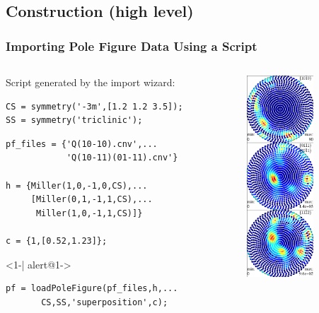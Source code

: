 \subsection*{Construction (high level)}

\begin{frame}[fragile]
  \frametitle{Importing Pole Figure Data Using a Script}

  \begin{columns}
    \begin{column}{8.5cm}

Script generated by the import wizard:

\begin{lstlisting}
CS = symmetry('-3m',[1.2 1.2 3.5]);
SS = symmetry('triclinic');
\end{lstlisting}

\pause

\begin{lstlisting}
pf_files = {'Q(10-10).cnv',...
            'Q(10-11)(01-11).cnv'}

h = {Miller(1,0,-1,0,CS),...
     [Miller(0,1,-1,1,CS),...
      Miller(1,0,-1,1,CS)]}

c = {1,[0.52,1.23]};
\end{lstlisting}

\pause

      \begin{actionenv}<1-| alert@1->
\begin{lstlisting}
pf = loadPoleFigure(pf_files,h,...
       CS,SS,'superposition',c);
\end{lstlisting}
      \end{actionenv}

    \end{column}

    \begin{column}{3cm}
      \includegraphics[width=2.5cm]{pic/pforig}
    \end{column}

  \end{columns}

\end{frame}



